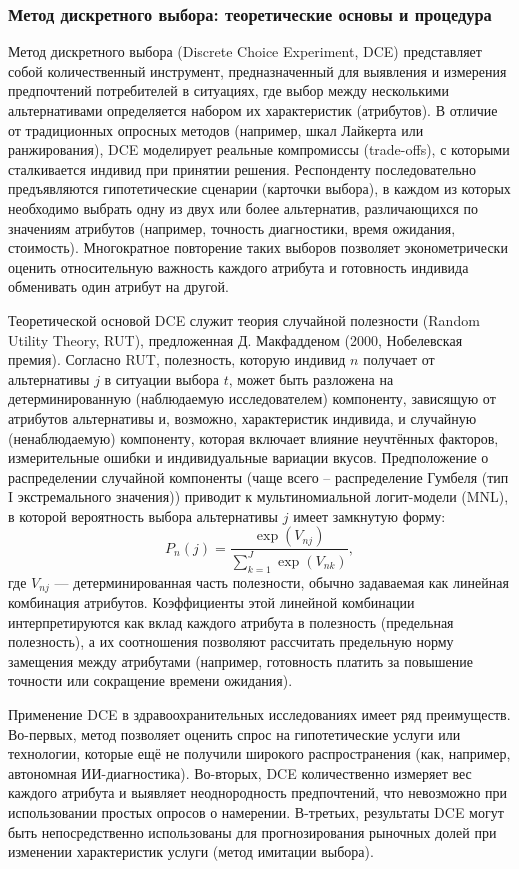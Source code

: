 \documentclass[12pt, a4paper]{article}
\begin{document}
\subsubsection{Метод дискретного выбора: теоретические основы и процедура}
Метод дискретного выбора (Discrete Choice Experiment, DCE) представляет собой количественный инструмент, предназначенный для выявления и измерения предпочтений потребителей в ситуациях, где выбор между несколькими альтернативами определяется набором их характеристик (атрибутов). В отличие от традиционных опросных методов (например, шкал Лайкерта или ранжирования), DCE моделирует реальные компромиссы (trade-offs), с которыми сталкивается индивид при принятии решения. Респонденту последовательно предъявляются гипотетические сценарии (карточки выбора), в каждом из которых необходимо выбрать одну из двух или более альтернатив, различающихся по значениям атрибутов (например, точность диагностики, время ожидания, стоимость). Многократное повторение таких выборов позволяет эконометрически оценить относительную важность каждого атрибута и готовность индивида обменивать один атрибут на другой.

Теоретической основой DCE служит теория случайной полезности (Random Utility Theory, RUT), предложенная Д. Макфадденом (2000, Нобелевская премия). Согласно RUT, полезность, которую индивид $n$ получает от альтернативы $j$ в ситуации выбора $t$, может быть разложена на детерминированную (наблюдаемую исследователем) компоненту, зависящую от атрибутов альтернативы и, возможно, характеристик индивида, и случайную (ненаблюдаемую) компоненту, которая включает влияние неучтённых факторов, измерительные ошибки и индивидуальные вариации вкусов. Предположение о распределении случайной компоненты (чаще всего -- распределение Гумбеля (тип I экстремального значения)) приводит к мультиномиальной логит-модели (MNL), в которой вероятность выбора альтернативы $j$ имеет замкнутую форму:
\[
P_{n}(j) = \frac{\exp(V_{nj})}{\sum_{k=1}^{J} \exp(V_{nk})},
\]
где $V_{nj}$ --- детерминированная часть полезности, обычно задаваемая как линейная комбинация атрибутов. Коэффициенты этой линейной комбинации интерпретируются как вклад каждого атрибута в полезность (предельная полезность), а их соотношения позволяют рассчитать предельную норму замещения между атрибутами (например, готовность платить за повышение точности или сокращение времени ожидания).

Применение DCE в здравоохранительных исследованиях имеет ряд преимуществ. Во-первых, метод позволяет оценить спрос на гипотетические услуги или технологии, которые ещё не получили широкого распространения (как, например, автономная ИИ-диагностика). Во-вторых, DCE количественно измеряет вес каждого атрибута и выявляет неоднородность предпочтений, что невозможно при использовании простых опросов о намерении. В-третьих, результаты DCE могут быть непосредственно использованы для прогнозирования рыночных долей при изменении характеристик услуги (метод имитации выбора).
\end{document}
